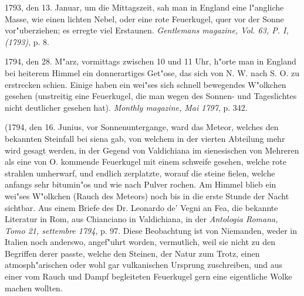 \documentclass[a4paper, 11pt, oneside, polutonikogreek, german]{article}
\begin{document}
1793, den 13. Januar, um die Mittagszeit, sah man in England eine l"angliche Masse, wie einen lichten Nebel, oder eine rote Feuerkugel, quer vor der Sonne vor"uberziehen; es erregte viel Erstaunen. \emph{Gentlemans magazine, Vol. 63, P. I, (1793)}, p. 8.

1794, den 28. M"arz, vormittags zwischen 10 und 11 Uhr, h"orte man in England bei heiterem Himmel ein donnerartiges Get"ose, das sich von N. W. nach S. O. zu erstrecken schien. Einige haben ein wei"ses sich schnell bewegendes W"olkchen gesehen (unstreitig eine Feuerkugel, die man wegen des Sonnen- und Tageslichtes nicht deutlicher gesehen hat). \emph{Monthly magazine, Mai 1797}, p. 342.

(1794, den 16. Junius, vor Sonnenuntergange, ward das Meteor, welches den bekannten Steinfall bei siena gab, von welchem in der vierten Abteilung mehr wird gesagt werden, in der Gegend von Valdichiana im sienesischen von Mehreren als eine von O. kommende Feuerkugel mit einem schweife gesehen, welche rote strahlen umherwarf, und endlich zerplatzte, worauf die steine fielen, welche anfangs sehr bitumin"os und wie nach Pulver rochen. Am Himmel blieb ein wei"ses W"olkchen (Rauch des Meteors) noch bis in die erste Stunde der Nacht sichtbar. Aus einem Briefe des Dr. Leonardo de' Vegni an Fea, die bekannte Literatur in Rom, aus Chianciano in Valdichiana, in der \emph{Antologia Romana, Tomo 21, settembre 1794}, p. 97. Diese Beobachtung ist von Niemanden, weder in Italien noch anderswo, angef"uhrt worden, vermutlich, weil sie nicht zu den Begriffen derer passte, welche den Steinen, der Natur zum Trotz, einen atmosph"arischen oder wohl gar vulkanischen Ursprung zuschreiben, und aus einer vom Rauch und Dampf begleiteten Feuerkugel gern eine eigentliche Wolke machen wollten.
\end{document}
